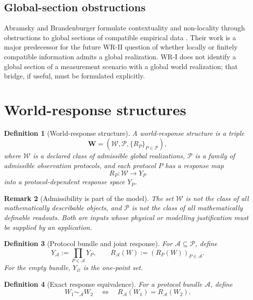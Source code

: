 \documentclass[11pt]{article}
\newtheorem{definition}{Definition}[section]
\newtheorem{remark}[definition]{Remark}
\newcommand{\W}{\mathcal W}
\newcommand{\Pcal}{\mathcal P}
\newcommand{\Acal}{\mathcal A}
\begin{document}
\subsection{Global-section obstructions}

Abramsky and Brandenburger formulate contextuality and non-locality through
obstructions to global sections of compatible empirical data
\cite{AbramskyBrandenburger2011}. Their work is a major predecessor for the
future WR-II question of whether locally or finitely compatible information
admits a global realization. WR-I does not identify a global section of a
measurement scenario with a global world realization; that bridge, if useful,
must be formulated explicitly.

\section{World-response structures}

\begin{definition}[World-response structure]
A \emph{world-response structure} is a triple
\[
\mathbf W=(\W,\Pcal,\{R_P\}_{P\in\Pcal}),
\]
where $\W$ is a declared class of \emph{admissible global realizations},
$\Pcal$ is a family of admissible observation protocols, and each protocol
$P$ has a response map
\[
R_P:\W\to Y_P
\]
into a protocol-dependent response space $Y_P$.
\end{definition}

\begin{remark}[Admissibility is part of the model]
The set $\W$ is not the class of all mathematically describable objects, and
$\Pcal$ is not the class of all mathematically definable readouts. Both are
inputs whose physical or modelling justification must be supplied by an
application.
\end{remark}

\begin{definition}[Protocol bundle and joint response]
For $\Acal\subseteq\Pcal$, define
\[
Y_{\Acal}:=\prod_{P\in\Acal}Y_P,
\qquad
R_{\Acal}(W):=(R_P(W))_{P\in\Acal}.
\]
For the empty bundle, $Y_{\varnothing}$ is the one-point set.
\end{definition}

\begin{definition}[Exact response equivalence]
For a protocol bundle $\Acal$, define
\[
W_1\sim_{\Acal}W_2
\quad\Longleftrightarrow\quad
R_{\Acal}(W_1)=R_{\Acal}(W_2).
\]
\end{definition}
\end{document}
